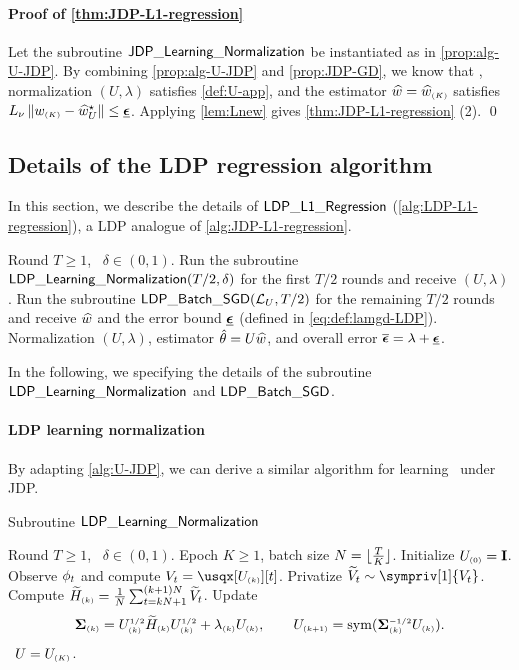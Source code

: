 \paragraph{Proof of \cref{thm:JDP-L1-regression}}
Let the subroutine $\mathsf{JDP\_Learning\_Normalization}$ be instantiated as in \cref{prop:alg-U-JDP}.
By combining \cref{prop:alg-U-JDP} and \cref{prop:JDP-GD}, we know that \whp[2\delta], normalization $(U,\lambda)$ satisfies \eqref{def:U-app}, and the estimator $\widehat{w}=\widehat{w}_{\scriptscriptstyle{ (K) }}$ satisfies $\Lipg\nrm{w\kc-\hwst}\leq \lamgd$. Applying \cref{lem:Lnew} gives \cref{thm:JDP-L1-regression} (2).
\qed

\subsection{Details of the LDP regression algorithm}\label{appdx:LDP-l1-regression}

In this section, we describe the details of $\AlgLDPRegression$ (\cref{alg:LDP-L1-regression}), a LDP analogue of \cref{alg:JDP-L1-regression}.

\begin{algorithm}[H]
\caption{$\AlgLDPRegression$ %
}\label{alg:LDP-L1-regression}
\begin{algorithmic}[1]
\REQUIRE Round $T\geq 1$, \errpara~$\delta\in(0,1)$.
\STATE Run the subroutine $\mathsf{LDP\_Learning\_Normalization}(T/2,\delta)$ for the first $T/2$ rounds and receive $(U,\lambda)$.
\STATE Run the subroutine $\mathsf{LDP\_Batch\_SGD}(\mathcal{L}_{U},T/2)$ for the remaining $T/2$ rounds and receive $\widehat{w}$ and the error bound $\lamgd$ (defined in \eqref{eq:def:lamgd-LDP}).
\ENSURE Normalization $(U,\lambda)$, estimator $\hat{\theta}=U\widehat{w}$, and overall error $\lamall=\lambda+\lamgd$.
\end{algorithmic}
\end{algorithm}

In the following, we specifying the details of the subroutine $\mathsf{LDP\_Learning\_Normalization}$ and $\mathsf{LDP\_Batch\_SGD}$.


\paragraph{LDP learning normalization}
By adapting \cref{alg:U-JDP}, we can derive a similar algorithm for learning \um~under JDP. 


\begin{algorithm}%
\caption{Subroutine $\mathsf{LDP\_Learning\_Normalization}$}\label{alg:U-LDP}
\begin{algorithmic}
\REQUIRE Round $T\geq 1$, \errpara~$\delta\in(0,1)$.
\REQUIRE Epoch $K\geq 1$, batch size $N=\lfloor\frac{T}{K}\rfloor$.
\STATE Initialize $U_{\scriptscriptstyle{ (0) }}=\mathbf{I}$.
        \STATE Observe $\phi_t$ and compute $V_t=\usqx[U\kk][t]$.
        \STATE Privatize $\til V_t\sim \sympriv[1]{V_t}$.    
    \ENDFOR
    \STATE Compute $\widetilde H_{\scriptscriptstyle{ (k) }}=\frac1N\sum_{t=kN+1}^{(k+1)N} \widetilde V_t$.
    \STATE Update
    \begin{align*}
        \boldsymbol{\Sigma}_{\scriptscriptstyle{ (k) }}=U_{\scriptscriptstyle{ (k) }}^{{\scriptscriptstyle1/2}} \widetilde H_{\scriptscriptstyle{ (k) }} U_{\scriptscriptstyle{ (k) }}^{{\scriptscriptstyle1/2}}+\lambda_{\scriptscriptstyle{ (k) }} U_{\scriptscriptstyle{ (k) }}, \qquad
        U_{\scriptscriptstyle{ (k+1) }}=\mathrm{sym}(\boldsymbol{\Sigma}_{\scriptscriptstyle{ (k) }}^{{\scriptscriptstyle-1/2}} U_{\scriptscriptstyle{ (k) }}).
    \end{align*}
\ENDFOR
\ENSURE \Um~$U=U_{\scriptscriptstyle{ (K) }}$.
\end{algorithmic}
\end{algorithm}

